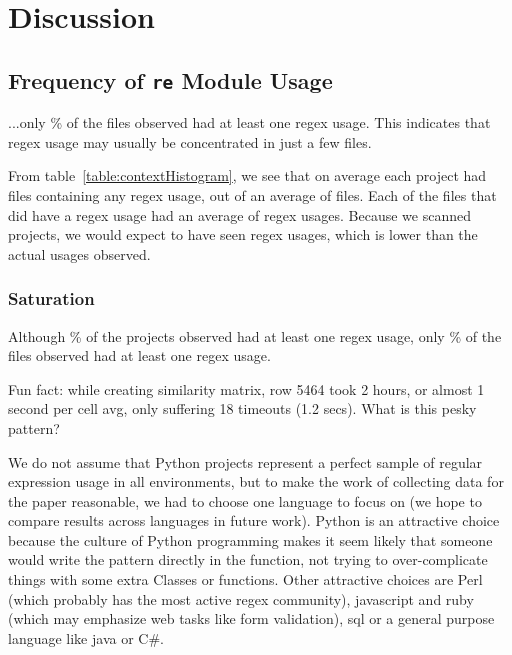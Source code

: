 \section{Discussion}
\label{sec:discussion}

\subsection{Frequency of {\tt re} Module Usage}
...only \% of the files observed had at least one regex usage.  This indicates that regex usage may usually be concentrated in just a few files.


From table~\ref{table:contextHistogram}, we see that on average each project had  files containing any regex usage, out of an average of  files.  Each of the files that did have a regex usage had an average of  regex usages.  Because we scanned  projects, we would expect to have seen  regex usages, which is lower than the actual  usages observed.
\subsubsection{Saturation}Although \% of the projects observed had at least one regex usage, only \% of the files observed had at least one regex usage.



Fun fact: while creating similarity matrix, row 5464 took 2 hours, or almost 1 second per cell avg, only suffering 18 timeouts (1.2 secs).  What is this pesky pattern?

We do not assume that Python projects represent a perfect sample of regular expression usage in all environments, but to make the work of collecting data for the paper reasonable, we had to choose one language to focus on (we hope to compare results across languages in future work).  Python is an attractive choice because the culture of Python programming makes it seem likely that someone would write the pattern directly in the function, not trying to over-complicate things with some extra Classes or functions.  Other attractive choices are Perl (which probably has the most active regex community), javascript and ruby (which may emphasize web tasks like form validation), sql or a general purpose language like java or C\#.

